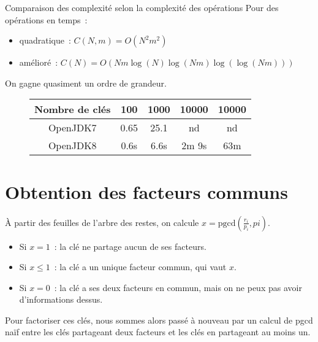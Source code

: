 \documentclass{beamer}
\begin{document}
\begin{frame}
  \begin{block}{Comparaison des complexité selon la complexité des opérations}
    Pour des opérations en temps~:
    \begin{itemize}
      \item quadratique~: $C(N,m) = O(N^2m^2)$
      \item amélioré~: $C(N) = O(Nm\log(N)\log(Nm)\log(\log(Nm)))$
    \end{itemize}
  \end{block}

  On gagne quasiment un ordre de grandeur.

  \begin{figure}[ht]
    \begin{center}
      \begin{tabular}{ccccc}
        \toprule
        Nombre de clés & 100 & 1000 & 10000 & 10000\\
        \midrule
        OpenJDK7 & 0.65 & 25.1 & nd & nd\\
        \midrule
        OpenJDK8 & 0.6s & 6.6s & 2m 9s & 63m\\
        \bottomrule
      \end{tabular}
    \end{center}
  \end{figure}
\end{frame}


\section{Obtention des facteurs communs}

\begin{frame}
  À partir des feuilles de l'arbre des restes, on calcule $x = \mathrm{pgcd}(\frac{r_i}{p_i},pi)$.
  \begin{itemize}
    \item Si $x=1$~: la clé ne partage aucun de ses facteurs.
    \item Si $x \leqslant 1$~: la clé a un unique facteur commun, qui vaut $x$.
    \item Si $x=0$~: la clé a ses deux facteurs en commun, mais on ne peux pas avoir d'informations dessus.
  \end{itemize}

  Pour factoriser ces clés, nous sommes alors passé à nouveau par un calcul de pgcd naïf entre les clés partageant deux facteurs et les clés en partageant au moins un.
\end{frame}
\end{document}
